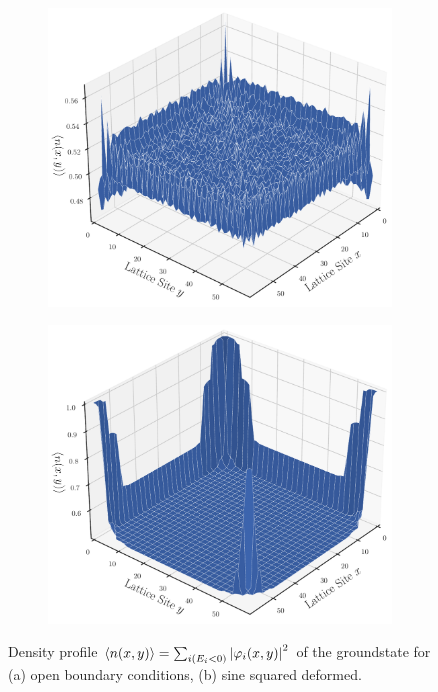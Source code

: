 \documentclass[11pt, a4paper]{article}
\theoremstyle{definition} %
\begin{document}
\begin{figure}[h]
\centering
		\begin{subfigure}[b]{0.45\textwidth}
			\includegraphics[width=\textwidth]{DensityprofileOBC}
			\caption{}
		\end{subfigure}
		\begin{subfigure}[b]{0.45\textwidth}
			\includegraphics[width=\textwidth]{DensityprofileSSD}
			\caption{}
		\end{subfigure}
		\caption{Density profile $\expval{n(x,y)} = \sum_{i (E_i < 0)} \abs{\varphi_{i}(x,y)}^2$ of the groundstate for (a) open boundary conditions, (b) sine squared deformed.}
\end{figure}
\end{document}

